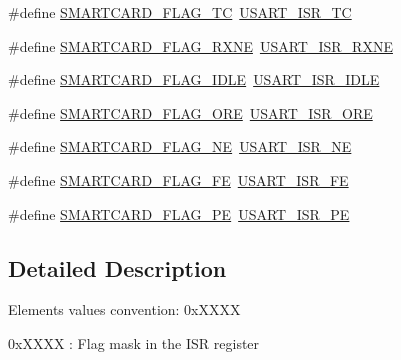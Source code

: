\begin{DoxyCompactItemize}
\item 
\#define \hyperlink{group___s_m_a_r_t_c_a_r_d___flags_ga778899c7c536fcbbcf3d6cc00b4139fb}{S\+M\+A\+R\+T\+C\+A\+R\+D\+\_\+\+F\+L\+A\+G\+\_\+\+TC}~\hyperlink{group___peripheral___registers___bits___definition_gaa41e8667b30453a6b966aded9f5e8cbb}{U\+S\+A\+R\+T\+\_\+\+I\+S\+R\+\_\+\+TC}
\item 
\#define \hyperlink{group___s_m_a_r_t_c_a_r_d___flags_ga1f617725b179572983789cbc7da1a955}{S\+M\+A\+R\+T\+C\+A\+R\+D\+\_\+\+F\+L\+A\+G\+\_\+\+R\+X\+NE}~\hyperlink{group___peripheral___registers___bits___definition_ga39da7549976e5a5c91deff40e6044f03}{U\+S\+A\+R\+T\+\_\+\+I\+S\+R\+\_\+\+R\+X\+NE}
\item 
\#define \hyperlink{group___s_m_a_r_t_c_a_r_d___flags_ga5576e74148257291b05dcc410f501e8a}{S\+M\+A\+R\+T\+C\+A\+R\+D\+\_\+\+F\+L\+A\+G\+\_\+\+I\+D\+LE}~\hyperlink{group___peripheral___registers___bits___definition_gacee745b19e0a6073280d234fdc96e627}{U\+S\+A\+R\+T\+\_\+\+I\+S\+R\+\_\+\+I\+D\+LE}
\item 
\#define \hyperlink{group___s_m_a_r_t_c_a_r_d___flags_ga48dfe32b52249f43c0e4396a29c07a85}{S\+M\+A\+R\+T\+C\+A\+R\+D\+\_\+\+F\+L\+A\+G\+\_\+\+O\+RE}~\hyperlink{group___peripheral___registers___bits___definition_ga9e5b4a08e3655bed8ec3022947cfc542}{U\+S\+A\+R\+T\+\_\+\+I\+S\+R\+\_\+\+O\+RE}
\item 
\#define \hyperlink{group___s_m_a_r_t_c_a_r_d___flags_ga14a7b77b47b2e83a4cf4ef6f8e8ee23b}{S\+M\+A\+R\+T\+C\+A\+R\+D\+\_\+\+F\+L\+A\+G\+\_\+\+NE}~\hyperlink{group___peripheral___registers___bits___definition_ga09c7d19477a091689f50bd0ef5b6a3d8}{U\+S\+A\+R\+T\+\_\+\+I\+S\+R\+\_\+\+NE}
\item 
\#define \hyperlink{group___s_m_a_r_t_c_a_r_d___flags_gaa85318d22a73dbbf1498363545999bf3}{S\+M\+A\+R\+T\+C\+A\+R\+D\+\_\+\+F\+L\+A\+G\+\_\+\+FE}~\hyperlink{group___peripheral___registers___bits___definition_ga27cc4dfb6d5e817a69c80471b87deb4b}{U\+S\+A\+R\+T\+\_\+\+I\+S\+R\+\_\+\+FE}
\item 
\#define \hyperlink{group___s_m_a_r_t_c_a_r_d___flags_ga19dfcc02f14bb270f559601cca5f433d}{S\+M\+A\+R\+T\+C\+A\+R\+D\+\_\+\+F\+L\+A\+G\+\_\+\+PE}~\hyperlink{group___peripheral___registers___bits___definition_gaa10e69d231b67d698ab59db3d338baa6}{U\+S\+A\+R\+T\+\_\+\+I\+S\+R\+\_\+\+PE}
\end{DoxyCompactItemize}


\subsection{Detailed Description}
Elements values convention\+: 0x\+X\+X\+XX
\begin{DoxyItemize}
\item 0x\+X\+X\+XX \+: Flag mask in the I\+SR register 
\end{DoxyItemize}

